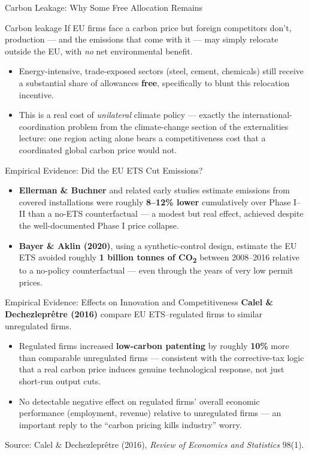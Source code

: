 \documentclass[11pt,aspectratio=169]{beamer}
\newcommand{\srcnote}[1]{{\footnotesize\color{wugray}Source: #1}}
\begin{document}
\begin{frame}{Carbon Leakage: Why Some Free Allocation Remains}
	\begin{block}{Carbon leakage}
		If EU firms face a carbon price but foreign competitors don't, production --- and the emissions that come with it --- may simply relocate outside the EU, with \emph{no} net environmental benefit.
	\end{block}
	\begin{itemize}
		\item Energy-intensive, trade-exposed sectors (steel, cement, chemicals) still receive a substantial share of allowances \textbf{free}, specifically to blunt this relocation incentive.
		\item This is a real cost of \emph{unilateral} climate policy --- exactly the international-coordination problem from the climate-change section of the externalities lecture: one region acting alone bears a competitiveness cost that a coordinated global carbon price would not.
	\end{itemize}
\end{frame}


\begin{frame}{Empirical Evidence: Did the EU ETS Cut Emissions?}
	\begin{itemize}
		\item \textbf{Ellerman \& Buchner} and related early studies estimate emissions from covered installations were roughly \textbf{8--12\% lower} cumulatively over Phase I--II than a no-ETS counterfactual --- a modest but real effect, achieved despite the well-documented Phase I price collapse.
		\item \textbf{Bayer \& Aklin (2020)}, using a synthetic-control design, estimate the EU ETS avoided roughly \textbf{1 billion tonnes of CO\textsubscript{2}} between 2008--2016 relative to a no-policy counterfactual --- even through the years of very low permit prices.
	\end{itemize}

\end{frame}

\begin{frame}{Empirical Evidence: Effects on Innovation and Competitiveness}
	\textbf{Calel \& Dechezleprêtre (2016)} compare EU ETS--regulated firms to similar unregulated firms.
	\begin{itemize}
		\item Regulated firms increased \textbf{low-carbon patenting} by roughly \textbf{10\%} more than comparable unregulated firms --- consistent with the corrective-tax logic that a real carbon price induces genuine technological response, not just short-run output cuts.
		\item No detectable negative effect on regulated firms' overall economic performance (employment, revenue) relative to unregulated firms --- an important reply to the ``carbon pricing kills industry'' worry.
	\end{itemize}
	\srcnote{Calel \& Dechezleprêtre (2016), \emph{Review of Economics and Statistics} 98(1).}
\end{frame}
\end{document}
